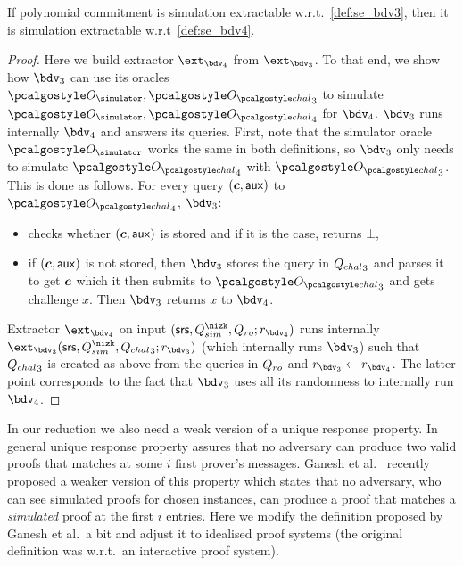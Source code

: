 \documentclass[runningheads,11pt]{llncs}
\let\spvec\vec
\let\vec\accentvec
\let\spvec\vec
\let\vec\spvec
\def\vec#1{\mathchoice{\mbox{\boldmath$\displaystyle#1$}}
  {\mbox{\boldmath$\textstyle#1$}} {\mbox{\boldmath$\scriptstyle#1$}}
  {\mbox{\boldmath$\scriptscriptstyle#1$}}}
\begin{document}
\begin{lemma}[]
  If polynomial commitment is simulation extractable w.r.t.~\cref{def:se_bdv3}, then
  it is simulation extractable w.r.t~\cref{def:se_bdv4}.
\end{lemma}
\begin{proof}
  Here we build extractor $\ext_{\bdv_4}$ from $\ext_{\bdv_3}$. To that end, we show
  how $\bdv_3$ can use its oracles $\oracles, \oraclec_3$ to simulate
  $\oracles, \oraclec_4$ for $\bdv_4$. $\bdv_3$ runs internally $\bdv_4$ and answers
  its queries. First, note that the simulator oracle $\oracles$ works the same in
  both definitions, so $\bdv_3$ only needs to simulate $\oraclec_4$ with
  $\oraclec_3$. This is done as follows. For every query $(\vec{c}, \aux)$ to
  $\oraclec_4$, $\bdv_3$:
  \begin{itemize}
  \item checks whether $(\vec{c}, \aux)$ is stored and if it is the case, returns
    $\bot$,
  \item if $(\vec{c}, \aux)$ is not stored, then $\bdv_3$ stores the query in
    ${Q_{chal}}_3$ and parses it to get $\vec{c}$ which it then submits to $\oraclec_3$
    and gets challenge $x$. Then $\bdv_3$ returns $x$ to $\bdv_4$.
  \end{itemize}

  Extractor $\ext_{\bdv_4}$ on input $(\srs, \Qsim, \Qh; r_{\bdv_4})$ runs internally
  $\ext_{\bdv_3} (\srs, \Qsim, \Qchal_3; r_{\bdv_3})$ (which internally runs
  $\bdv_3$) such that ${Q_{chal}}_3$ is created as above from the queries in $Q_{ro}$ and
  $r_{\bdv_3} \gets r_{\bdv_4}$. The latter point corresponds to the fact that
  $\bdv_3$ uses all its randomness to internally run $\bdv_4$.
\end{proof}
\fi

In our reduction we also need a weak version of a unique response property. In
general unique response property assures that no adversary can produce two valid
proofs that matches at some $i$ first prover's messages. Ganesh et al.~\cite{}
recently proposed a weaker version of this property which states that no adversary,
who can see simulated proofs for chosen instances, can produce a proof that matches a
\emph{simulated} proof at the first $i$ entries. Here we modify the definition
proposed by Ganesh et al.~a bit and adjust it to idealised proof systems (the
original definition was w.r.t.~an interactive proof system). 
\end{document}
